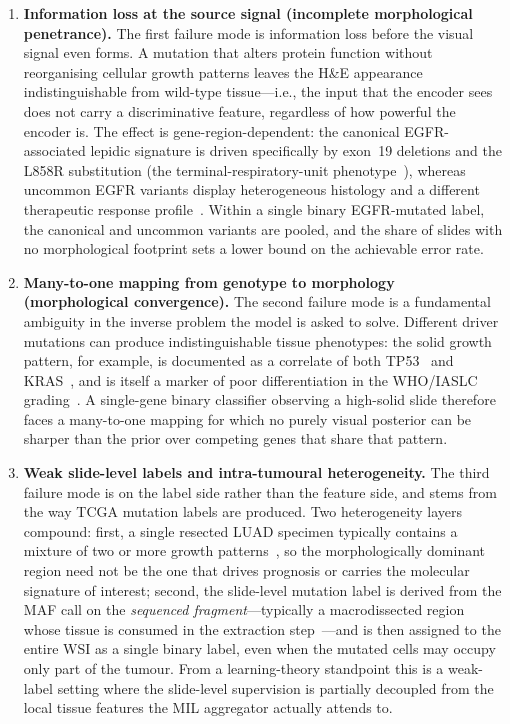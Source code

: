 \begin{enumerate}
    \item \textbf{Information loss at the source signal
    (incomplete morphological penetrance).}
    The first failure mode is information loss before the visual
    signal even forms.
    A mutation that alters protein function without reorganising
    cellular growth patterns leaves the H\&E appearance
    indistinguishable from wild-type tissue---i.e., the input
    that the encoder sees does not carry a discriminative
    feature, regardless of how powerful the encoder is.
    The effect is gene-region-dependent: the canonical
    EGFR-associated lepidic signature is driven specifically by
    exon~19 deletions and the L858R substitution (the
    terminal-respiratory-unit
    phenotype~\cite{yatabe2005egfrlepidic}), whereas uncommon
    EGFR variants display heterogeneous histology and a different
    therapeutic response
    profile~\cite{brindel2020uncommonegfr}.
    Within a single binary EGFR-mutated label, the canonical and
    uncommon variants are pooled, and the share of slides with no
    morphological footprint sets a lower bound on the
    achievable error rate.

    \item \textbf{Many-to-one mapping from genotype to morphology
    (morphological convergence).}
    The second failure mode is a fundamental ambiguity in the
    inverse problem the model is asked to solve.
    Different driver mutations can produce indistinguishable
    tissue phenotypes: the solid growth pattern, for example, is
    documented as a correlate of both
    TP53~\cite{ahn2022tp53highgrade} and
    KRAS~\cite{rekhtman2013krassolid}, and is itself a marker of
    poor differentiation in the WHO/IASLC
    grading~\cite{who2021thoracic,moreira2020ialcslurp}.
    A single-gene binary classifier observing a high-solid slide
    therefore faces a many-to-one mapping for which no purely
    visual posterior can be sharper than the prior over
    competing genes that share that pattern.

    \item \textbf{Weak slide-level labels and intra-tumoural
    heterogeneity.}
    The third failure mode is on the label side rather than the
    feature side, and stems from the way TCGA mutation labels are
    produced.
    Two heterogeneity layers compound: first, a single resected
    LUAD specimen typically contains a mixture of two or more
    growth
    patterns~\cite{warth2012interobserver,moreira2020ialcslurp},
    so the morphologically dominant region need not be the one
    that drives prognosis or carries the molecular signature of
    interest;
    second, the slide-level mutation label is derived from the
    MAF call on the \emph{sequenced fragment}---typically a
    macrodissected region whose tissue is consumed in the
    extraction step~\cite{gdc2024maf}---and is then assigned to
    the entire WSI as a single binary label, even when the
    mutated cells may occupy only part of the tumour.
    From a learning-theory standpoint this is a weak-label
    setting where the slide-level supervision is partially
    decoupled from the local tissue features the MIL aggregator
    actually attends to.


\end{enumerate}
